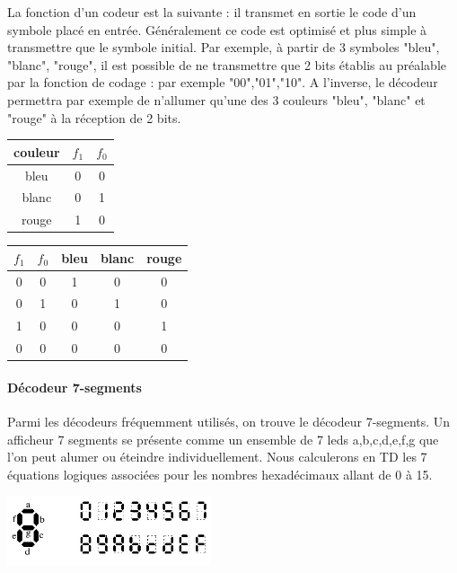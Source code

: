 La fonction d'un codeur est la suivante : il transmet en sortie le code d'un symbole placé en entrée. Généralement ce code
est optimisé et plus simple à transmettre que le symbole initial. Par exemple, à partir de 3 symboles "bleu", "blanc", "rouge", il est
possible de ne transmettre que 2 bits établis au préalable par la fonction de codage : par exemple "00","01","10". A l'inverse, le décodeur
permettra par exemple de n'allumer qu'une des 3 couleurs "bleu", "blanc" et "rouge" à la réception de 2 bits.
\begin{center}
   \begin{minipage}[t]{4cm}
     \vspace{5pt}
     \centering
     \begin{tabular}{|c||c|c|}
       \hline
       couleur & $f_1$ & $f_0$ \\ \hline
       bleu    &    0  &     0 \\ \hline
       blanc   &    0  &     1 \\ \hline
       rouge   &    1  &     0 \\ \hline
     \end{tabular}
   \end{minipage}%
   \begin{minipage}[t]{9cm}
     \vspace{0pt}
     \centering
     \begin{tabular}{|c|c||c|c|c|}
       \hline
       $f_1$ & $f_0$ & bleu & blanc & rouge \\ \hline
          0  &     0 & 1 & 0 & 0 \\ \hline
          0  &     1 & 0 & 1 & 0 \\ \hline
          1  &     0 & 0 & 0 & 1 \\ \hline
          0  &     0 & 0 & 0 & 0 \\ \hline
     \end{tabular}
   \end{minipage}
\end{center} %

\paragraph{Décodeur 7-segments}
Parmi les décodeurs fréquemment utilisés, on trouve le décodeur 7-segments. Un afficheur 7 segments se présente comme un ensemble de 7 leds a,b,c,d,e,f,g
que l'on peut alumer ou éteindre individuellement. Nous calculerons en TD les 7 équations logiques associées pour les nombres hexadécimaux allant de 0 à 15.
\begin{center}
  \centering
  \includegraphics[width=6cm]{./figures/afficheur-7seg.png}
\end{center}

